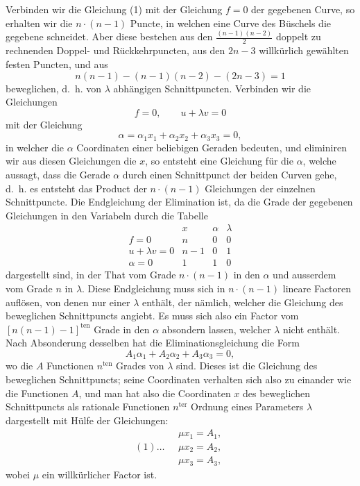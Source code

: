 \documentclass[10pt]{article}
\begin{document}
Verbinden wir die Gleichung (1) mit der Gleichung \(f=0\) der gegebenen Curve, so erhalten wir die \(n\cdot(n-1)\) Puncte, in welchen eine Curve des Büschels die gegebene schneidet. Aber diese bestehen aus den \(\frac{(n-1)(n-2)}{2}\) doppelt zu rechnenden Doppel- und Rückkehrpuncten, aus den \(2n-3\) willkürlich gewählten festen Puncten, und aus
\[
n(n-1)-(n-1)(n-2)-(2n-3)=1
\]
beweglichen, d.\ h. von \(\lambda\) abhängigen Schnittpuncten. Verbinden wir die Gleichungen
\[
f=0,\qquad u+\lambda v=0
\]
mit der Gleichung
\[
\alpha=\alpha_1x_1+\alpha_2x_2+\alpha_3x_3=0,
\]
in welcher die \(\alpha\) Coordinaten einer beliebigen Geraden bedeuten, und eliminiren wir aus diesen Gleichungen die \(x\), so entsteht eine Gleichung für die \(\alpha\), welche aussagt, dass die Gerade \(\alpha\) durch einen Schnittpunct der beiden Curven gehe, d.\ h. es entsteht das Product der \(n\cdot(n-1)\) Gleichungen der einzelnen Schnittpuncte. Die Endgleichung der Elimination ist, da die Grade der gegebenen Gleichungen in den Variabeln durch die Tabelle
\[
\begin{array}{c|ccc}
 & x & \alpha & \lambda\\ \hline
f=0 & n & 0 & 0\\
u+\lambda v=0 & n-1 & 0 & 1\\
\alpha=0 & 1 & 1 & 0
\end{array}
\]
dargestellt sind, in der That vom Grade \(n\cdot(n-1)\) in den \(\alpha\) und ausserdem vom Grade \(n\) in \(\lambda\). Diese Endgleichung muss sich in \(n\cdot(n-1)\) lineare Factoren auflösen, von denen nur einer \(\lambda\) enthält, der nämlich, welcher die Gleichung des beweglichen Schnittpuncts angiebt. Es muss sich also ein Factor vom \([n(n-1)-1]^{\text{ten}}\) Grade in den \(\alpha\) absondern lassen, welcher \(\lambda\) nicht enthält. Nach Absonderung desselben hat die Eliminationsgleichung die Form
\[
A_1\alpha_1+A_2\alpha_2+A_3\alpha_3=0,
\]
wo die \(A\) Functionen \(n^{\text{ten}}\) Grades von \(\lambda\) sind. Dieses ist die Gleichung des beweglichen Schnittpuncts; seine Coordinaten verhalten sich also zu einander wie die Functionen \(A\), und man hat also die Coordinaten \(x\) des beweglichen Schnittpuncts als rationale Functionen \(n^{\text{ter}}\) Ordnung eines Parameters \(\lambda\) dargestellt mit Hülfe der Gleichungen:
\[
(1)\ldots\quad
\begin{gathered}
\mu x_1=A_1,\\
\mu x_2=A_2,\\
\mu x_3=A_3,
\end{gathered}
\]
wobei \(\mu\) ein willkürlicher Factor ist.
\end{document}
